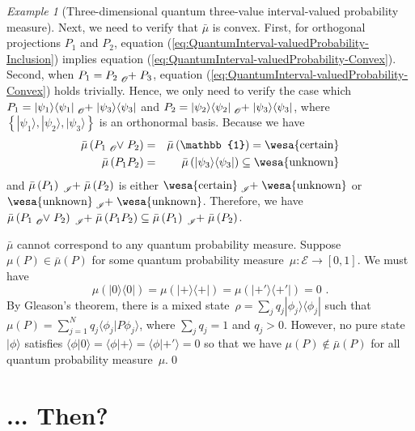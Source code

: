 \documentclass{article}
\theoremstyle{remark}
\newtheorem{example}{Example}
\newcommand{\events}{\ensuremath{\mathcal{E}}}
\newcommand{\ket}[1]{|#1\rangle}
\newcommand{\ip}[2]{\langle #1 | #2 \rangle}
\newcommand{\proj}[1]{|#1 \rangle\langle #1 |}
\newcommand{\ps}{\texttt{+}}
\newcommand{\necess}{{\mbox{\wesa{certain}}}}
\newcommand{\unknown}{{\mbox{\wesa{unknown}}}}
\begin{document}
\begin{example}[Three-dimensional quantum three-value interval-valued
probability measure]
Next, we need to verify that $\bar{\mu}$ is convex. First, for orthogonal
projections $P_{1}$ and $P_{2}$, equation (\ref{eq:QuantumInterval-valuedProbability-Inclusion})
implies equation (\ref{eq:QuantumInterval-valuedProbability-Convex}).
Second, when $P_{1}=P_{2}\tensor*[_{\mathscr{O}}]{+}{}P_{3}$, equation
(\ref{eq:QuantumInterval-valuedProbability-Convex}) holds trivially.
Hence, we only need to verify the case which $P_{1}=\proj{\psi_{1}}\tensor*[_{\mathscr{O}}]{+}{}\proj{\psi_{3}}$
and $P_{2}=\proj{\psi_{2}}\tensor*[_{\mathscr{O}}]{+}{}\proj{\psi_{3}}$,
where $\left\{ \ket{\psi_{1}},\ket{\psi_{2}},\ket{\psi_{3}}\right\} $
is an orthonormal basis. Because we have 
\begin{eqnarray*}
\bar{\mu}\left(P_{1}\tensor*[_{\mathscr{O}}]{\vee}{}P_{2}\right) & = & \bar{\mu}\left(\mathbb{1}\right)=\necess\\
\bar{\mu}\left(P_{1}P_{2}\right) & = & \bar{\mu}\left(\proj{\psi_{3}}\right)\subseteq\unknown
\end{eqnarray*}
and $\bar{\mu}\left(P_{1}\right)\tensor*[_{\mathscr{I}}]{+}{}\bar{\mu}\left(P_{2}\right)$
is either $\necess\tensor*[_{\mathscr{I}}]{+}{}\unknown$ or $\unknown\tensor*[_{\mathscr{I}}]{+}{}\unknown$.
Therefore, we have $\bar{\mu}\left(P_{1}\tensor*[_{\mathscr{O}}]{\vee}{}P_{2}\right)\tensor*[_{\mathscr{I}}]{+}{}\bar{\mu}\left(P_{1}P_{2}\right)\subseteq\bar{\mu}\left(P_{1}\right)\tensor*[_{\mathscr{I}}]{+}{}\bar{\mu}\left(P_{2}\right)$.

$\bar{\mu}$ cannot correspond to any quantum probability measure.
Suppose $\mu(P)\in\bar{\mu}(P)$ for some quantum probability measure~$\mu:\events\rightarrow\left[0,1\right]$.
We must have 
\begin{equation}
\mu(\proj{0})=\mu(\proj{\ps})=\mu(\proj{\ps'})=0\textrm{ .}\label{eq:probability-zero-on-states}
\end{equation}
By Gleason's theorem, there is a mixed state~$\rho=\sum_{j}q_{j}\proj{\phi_{j}}$
such that $\mu\left(P\right)=\sum_{j=1}^{N}q_{j}\ip{\phi_{j}}{P\phi_{j}}$,
where $\sum_{j}q_{j}=1$ and $q_{j}>0$. However, no pure state~$\ket{\phi}$
satisfies $\ip{\phi}{0}=\ip{\phi}{\ps}=\ip{\phi}{\ps'}=0$ so that
we have $\mu(P)\notin\bar{\mu}(P)$ for all quantum probability measure~$\mu$.\qed\end{example}



\section{... Then?}
\end{document}
